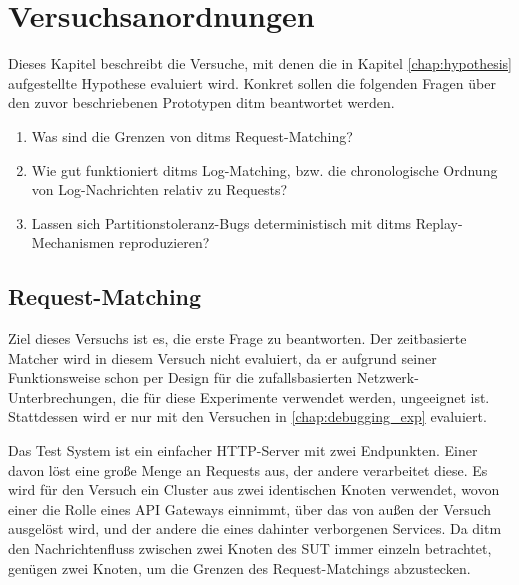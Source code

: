 \documentclass[12pt,a4paper]{report}
\begin{document}
\chapter{Versuchsanordnungen}
\label{chap:experiments}
Dieses Kapitel beschreibt die Versuche, mit denen die in Kapitel \ref{chap:hypothesis} aufgestellte Hypothese evaluiert wird.
Konkret sollen die folgenden Fragen über den zuvor beschriebenen Prototypen ditm beantwortet werden.
\begin{enumerate}
	\item Was sind die Grenzen von ditms Request-Matching?
	\item Wie gut funktioniert ditms Log-Matching, bzw. die chronologische Ordnung von Log-Nachrichten relativ zu Requests?
	\item Lassen sich Partitionstoleranz-Bugs deterministisch mit ditms Replay-Mechanismen reproduzieren?
\end{enumerate}
\section{Request-Matching}
\label{chap:exp_matching}
Ziel dieses Versuchs ist es, die erste Frage zu beantworten.
Der zeitbasierte Matcher wird in diesem Versuch nicht evaluiert, da er aufgrund seiner Funktionsweise schon per Design für die
zufallsbasierten Netzwerk-Unterbrechungen, die für diese Experimente verwendet werden, ungeeignet ist. Stattdessen wird er nur mit
den Versuchen in \ref{chap:debugging_exp} evaluiert.

Das Test System ist ein einfacher HTTP-Server mit zwei Endpunkten. Einer davon löst eine große Menge an Requests aus, der andere
verarbeitet diese. Es wird für den Versuch ein Cluster aus zwei identischen Knoten verwendet, wovon einer die Rolle eines API
Gateways einnimmt, über das von außen der Versuch ausgelöst wird, und der andere die eines dahinter verborgenen Services. Da ditm
den Nachrichtenfluss zwischen zwei Knoten des SUT immer einzeln betrachtet, genügen zwei Knoten, um die Grenzen des
Request-Matchings abzustecken.
\end{document}
